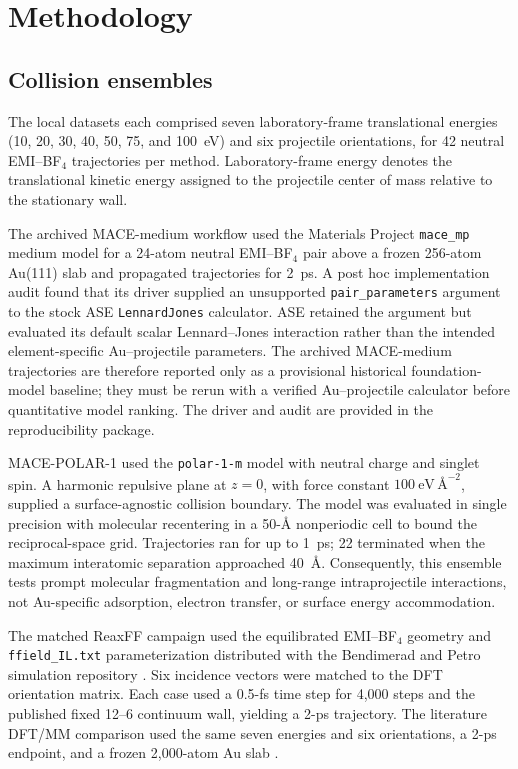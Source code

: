 \documentclass[preprint,review,12pt]{elsarticle}
\begin{document}
\section{Methodology}
\label{sec:methodology}

\subsection{Collision ensembles}
\label{sec:ensembles}

The local datasets each comprised seven laboratory-frame translational
energies (10, 20, 30, 40, 50, 75, and 100~eV) and six projectile orientations,
for 42 neutral EMI--BF$_4$ trajectories per method. Laboratory-frame energy
denotes the translational kinetic energy assigned to the projectile center of
mass relative to the stationary wall.

The archived MACE-medium workflow used the Materials Project
\texttt{mace\_mp} medium model for a 24-atom neutral EMI--BF$_4$ pair above a
frozen 256-atom Au(111) slab and propagated trajectories for 2~ps. A post hoc
implementation audit found that its driver supplied an unsupported
\texttt{pair\_parameters} argument to the stock ASE \texttt{LennardJones}
calculator. ASE retained the argument but evaluated its default scalar
Lennard--Jones interaction rather than the intended element-specific
Au--projectile parameters. The archived MACE-medium trajectories are therefore
reported only as a provisional historical foundation-model baseline; they
must be rerun with a verified Au--projectile calculator before quantitative
model ranking. The driver and audit are provided in the reproducibility
package.

MACE-POLAR-1 used the \texttt{polar-1-m} model with neutral charge and singlet
spin. A harmonic repulsive plane at \(z=0\), with force constant
\(100~\mathrm{eV\,\text{\AA}^{-2}}\), supplied a surface-agnostic collision
boundary. The model was evaluated in single precision with molecular
recentering in a 50-\AA{} nonperiodic cell to bound the reciprocal-space grid.
Trajectories ran for up to 1~ps; 22 terminated when the maximum interatomic
separation approached 40~\AA. Consequently, this ensemble tests prompt
molecular fragmentation and long-range intraprojectile interactions, not
Au-specific adsorption, electron transfer, or surface energy accommodation.

The matched ReaxFF campaign used the equilibrated EMI--BF$_4$ geometry and
\texttt{ffield\_IL.txt} parameterization distributed with the Bendimerad and
Petro simulation repository \cite{Bendimerad2022}. Six incidence vectors were
matched to the DFT orientation matrix. Each case used a 0.5-fs time step for
4,000 steps and the published fixed 12--6 continuum wall, yielding a 2-ps
trajectory. The literature DFT/MM comparison used the same seven energies and
six orientations, a 2-ps endpoint, and a frozen 2,000-atom Au slab
\cite{Laws2026}.
\end{document}
